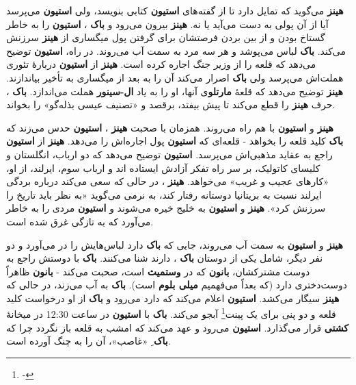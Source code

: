 \documentclass[12pt]{book}
\newcommand{\noun}[1]{{\textbf{#1}}}
\begin{document}
    \noun{هینز}  می‌گوید که تمایل دارد تا از گفته‌های \noun{استیون} کتابی بنویسد، ولی \noun{استیون} می‌پرسد آیا از آن پولی به دست می‌آید یا نه. \noun{هینز}  بیرون می‌رود و \noun{باک} ، \noun{استیون} را به خاطر گستاخ بودن و از بین بردن فرصتشان برای گرفتن پول میگساری از \noun{هینز}  سرزنش می‌کند. \noun{باک}  لباس می‌پوشد و هر سه مرد به سمت آب می‌روند. در راه، \noun{استیون} توضیح می‌دهد که قلعه را از وزیر جنگ اجاره کرده است. \noun{هینز}  از \noun{استیون} دربارهٔ تئوری هملت‌اش می‌پرسد ولی \noun{باک}  اصرار می‌کند آن را به بعد از میگساری به تأخیر بیاندازند. \noun{هینز}  توضیح می‌دهد که قلعهٔ \noun{مارتلو}ی آنها، او را به یاد \noun{ال-سینور} هملت می‌اندازد. \noun{باک} ، حرف \noun{هینز}  را قطع می‌کند تا پیش بیفتد، برقصد و «تصنیف عیسی بذله‌گو» را بخواند.

    \noun{هینز}  و \noun{استیون} با هم راه می‌روند. همزمان با صحبت \noun{هینز} ، \noun{استیون} حدس می‌زند که \noun{باک}  کلید قلعه را بخواهد - قلعه‌ای که \noun{استیون} پول اجاره‌اش را می‌دهد. \noun{هینز}  از \noun{استیون} راجع به عقاید مذهبی‌اش می‌پرسد. \noun{استیون} توضیح می‌دهد که دو ارباب، انگلستان و کلیسای کاتولیک، بر سر راه تفکر آزادش ایستاده اند و ارباب سوم، ایرلند، از او، «کارهای عجیب و غریب» می‌خواهد. \noun{هینز} ، در حالی که سعی می‌کند درباره بردگی ایرلند نسبت به بریتانیا دوستانه رفتار کند، به نرمی می‌گوید «به نظر باید تاریخ را سرزنش کرد». \noun{هینز}  و \noun{استیون} به خلیج خیره می‌شوند و \noun{استیون} مردی را به خاطر می‌آورد که به تازگی غرق شده است.

    \noun{هینز}  و \noun{استیون} به سمت آب می‌روند، جایی که \noun{باک}  دارد لباس‌هایش را در می‌آورد و دو نفر دیگر، شامل یکی از دوستان \noun{باک} ، دارند شنا می‌کنند. \noun{باک}  با دوستش راجع به دوست مشترکشان، \noun{بانون} که در \noun{وستمیث} است، صحبت می‌کند - \noun{بانون} ظاهراً دوست‌دختری دارد (که بعداً می‌فهمیم \noun{میلی بلوم} است). \noun{باک}  به آب می‌زند، در حالی که \noun{هینز}  سیگار می‌کشد. \noun{استیون} اعلام می‌کند که دارد می‌رود و \noun{باک}  از او درخواست کلید قلعه و دو پنی برای یک پینت\footnote{-} آبجو می‌کند. \noun{باک}  با \noun{استیون} در ساعت 12:30 در میخانهٔ \noun{کشتی} قرار می‌گذارد. \noun{استیون} می‌رود و عهد می‌کند که امشب به قلعه باز نگردد چرا که \noun{باک} ِ «غاصب»، آن را به چنگ آورده است.
\end{document}
